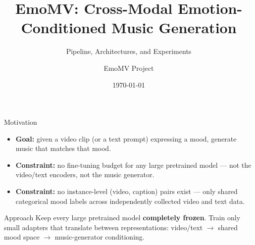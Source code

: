\documentclass[aspectratio=169,11pt]{beamer}
\title{EmoMV: Cross-Modal Emotion-Conditioned Music Generation}
\subtitle{Pipeline, Architectures, and Experiments}
\author{EmoMV Project}
\date{\today}
\begin{document}
\begin{frame}
\titlepage
\end{frame}

\begin{frame}{Motivation}
\begin{itemize}
  \item \textbf{Goal:} given a video clip (or a text prompt) expressing a mood, generate music
  that matches that mood.
  \item \textbf{Constraint:} no fine-tuning budget for any large pretrained model --- not the
  video/text encoders, not the music generator.
  \item \textbf{Constraint:} no instance-level (video, caption) pairs exist --- only shared
  categorical mood labels across independently collected video and text data.
\end{itemize}
\vspace{4mm}
\begin{block}{Approach}
Keep every large pretrained model \textbf{completely frozen}. Train only small adapters that
translate between representations: video/text $\to$ shared mood space $\to$ music-generator
conditioning.
\end{block}
\end{frame}
\end{document}
